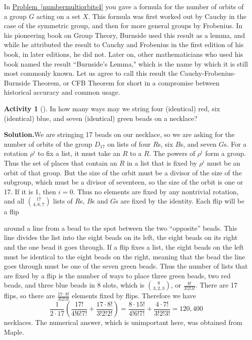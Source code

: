 \documentclass[10pt,]{book}
\theoremstyle{plain}
\theoremstyle{definition}
\newtheorem{activity}[project]{Activity}
\numberwithin{equation}{chapter}
\begin{document}
In \hyperref[numbermultiorbits4]{Problem~\ref{numbermultiorbits4}} you gave a formula for the number of orbits of a group \(G\) acting on a set \(X\). This formula was first worked out by Cauchy in the case of the symmetric group, and then for more general groups by Frobenius. In his pioneering book on Group Theory, Burnside used this result as a lemma, and while he attributed the result to Cauchy and Frobenius in the first edition of his book, in later editions, he did not. Later on, other mathematicians who used his book named the result ``Burnside's Lemma," which is the name by which it is still most commonly known. Let us agree to call this result the Cauchy-Frobenius-Burnside Theorem, or CFB Theorem for short in a compromise between historical accuracy and common usage.%
\begin{activity}[]\label{activity-296}
In how many ways may we string four (identical) red, six (identical) blue, and seven (identical) green beads on a necklace?%
\par\medskip\noindent%
\textbf{Solution.}\quad We are stringing 17 beads on our necklace, so we are asking for the number of orbits of the group \(D_{17}\) on lists of four \(R\)s, six \(B\)s, and seven \(G\)s. For a rotation \(\rho^i\) to fix a list, it must take an \(R\) to a \(R\). The powers of \(\rho^i\) form a group. Thus the set of places that contain an \(R\) in a list that is fixed by \(\rho^i\) must be an orbit of that group. But the size of the orbit must be a divisor of the size of the subgroup, which must be a divisor of seventeen, so the size of the orbit is one or 17. If it is 1, then \(i=0\). Thus no elements are fixed by any nontrivial rotation, and all \(\binom{17}{4,6,7}\) lists of \(R\)s, \(B\)s and \(G\)s are fixed by the identity. Each flip will be a flip \strut around a line from a bead to the spot between the two ``opposite'' beads. This line divides the list into the eight beads on its left, the eight beads on its right and the one bead it goes through. If a flip fixes a list, the eight beads on the left must be identical to the eight beads on the right, meaning that the bead the line goes through must be one of the seven green beads. Thus the number of lists that are fixed by a flip is the number of ways to place three green beads, two red beads, and three blue beads in 8 slots, which is \(\binom{8}{3,2,3}\), or \(\frac{8!}{3!2!3!}\). There are 17 flips, so there are \(\frac{17\cdot8!}{3!2!3!}\) elements fixed by flips. Therefore we have%
\begin{equation*}
\frac{1}{2\cdot 17}\left(\frac{17!}{4!6!7!} + \frac{17\cdot8!}{3!2!2!}\right) =
\frac{8\cdot15!}{4!6!7!} + \frac{4\cdot7!}{3!2!3!}= 120,400
\end{equation*}
necklaces. The numerical answer, which is unimportant here, was obtained from Maple.%
\end{activity}
\end{document}
